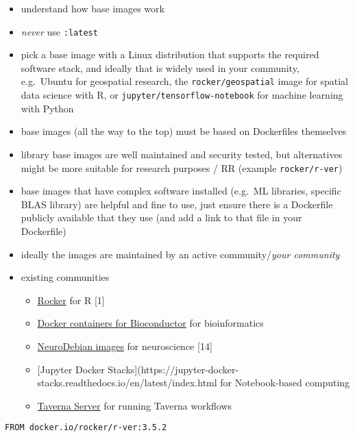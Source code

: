 \documentclass[10pt,letterpaper]{article}
\providecommand{\tightlist}{%
  \setlength{\itemsep}{0pt}\setlength{\parskip}{0pt}}
\begin{document}
\begin{itemize}
\tightlist
\item
  understand how base images work
\item
  \emph{never} use \texttt{:latest}
\item
  pick a base image with a Linux distribution that supports the required
  software stack, and ideally that is widely used in your community,
  e.g.~Ubuntu for geospatial research, the \texttt{rocker/geospatial}
  image for spatial data science with R, or
  \texttt{jupyter/tensorflow-notebook} for machine learning with Python
\item
  base images (all the way to the top) must be based on Dockerfiles
  themselves
\item
  library base images are well maintained and security tested, but
  alternatives might be more suitable for research purposes / RR
  (example \texttt{rocker/r-ver})
\item
  base images that have complex software installed (e.g.~ML libraries,
  specific BLAS library) are helpful and fine to use, just ensure there
  is a Dockerfile publicly available that they use (and add a link to
  that file in your Dockerfile)
\item
  ideally the images are maintained by an active community/\emph{your
  community}
\item
  existing communities

  \begin{itemize}
  \tightlist
  \item
    \href{https://www.rocker-project.org/}{Rocker} for R {[}1{]}
  \item
    \href{https://bioconductor.org/help/docker/}{Docker containers for
    Bioconductor} for bioinformatics
  \item
    \href{https://hub.docker.com/_/neurodebian}{NeuroDebian images} for
    neuroscience {[}14{]}
  \item
    {[}Jupyter Docker
    Stacks{]}(https://jupyter-docker-stacks.readthedocs.io/en/latest/index.html
    for Notebook-based computing
  \item
    \href{https://hub.docker.com/r/taverna/taverna-server}{Taverna
    Server} for running Taverna workflows
  \end{itemize}
\end{itemize}

\begin{verbatim}
FROM docker.io/rocker/r-ver:3.5.2
\end{verbatim}
\end{document}
